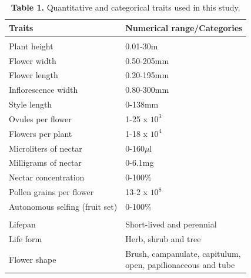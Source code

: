 \documentclass[
  12pt,
  a4paper,
]{article}
\begin{document}
\begin{table}

\caption{\label{tab:unnamed-chunk-1}\textbf{Table 1.} Quantitative and categorical traits used in this study.}
\centering
\fontsize{12}{14}\selectfont
\begin{tabular}[t]{ll}
\toprule
\textbf{Traits} & \textbf{Numerical range/Categories}\\
\midrule
\addlinespace[0.3em]
\multicolumn{2}{l}{\textbf{Quantitative}}\\
\hspace{1em}Plant height & 0.01-30m\\
\hspace{1em}Flower width & 0.50-205mm\\
\hspace{1em}Flower length & 0.20-195mm\\
\hspace{1em}Inflorescence width & 0.80-300mm\\
\hspace{1em}Style length & 0-138mm\\
\hspace{1em}Ovules per flower & 1-25 x $10^3$\\
\hspace{1em}Flowers per plant & 1-18 x $10^4$\\
\hspace{1em}Microliters of nectar & 0-160$\mu$l\\
\hspace{1em}Milligrams of nectar & 0-6.1mg\\
\hspace{1em}Nectar concentration & 0-100$\%$\\
\hspace{1em}Pollen grains per flower & 13-2 x $10^8$\\
\hspace{1em}Autonomous selfing (fruit set) & 0-100$\%$\\
\addlinespace[0.3em]
\multicolumn{2}{l}{\textbf{Categorical}}\\
\hspace{1em}Lifepan & Short-lived and perennial\\
\hspace{1em}Life form & Herb, shrub and tree\\
\hspace{1em}Flower shape & \makecell[l]{Brush, campanulate, capitulum,\\ open, papilionaceous and tube}\\

\end{tabular}
\end{table}
\end{document}
